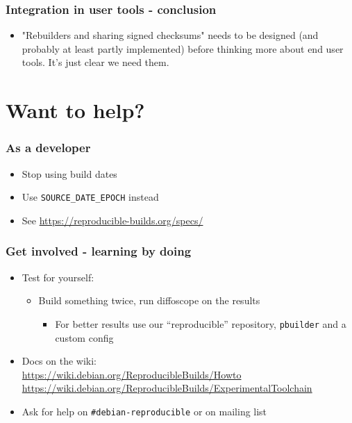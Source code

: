 \documentclass[14pt]{beamer}
\begin{document}
\begin{frame}
 \frametitle{Integration in user tools - conclusion}
 \begin{itemize}
  \item "Rebuilders and sharing signed checksums" needs to be designed
  (and probably at least partly implemented) before thinking more about end
  user tools. It's just clear we need them. 
 \end{itemize}
\end{frame}

\section{Want to help?}

\begin{frame}
 \frametitle{As a developer}
 \begin{itemize}
  \item Stop using build dates
  \item Use \texttt{SOURCE\_DATE\_EPOCH} instead
  \item See \url{https://reproducible-builds.org/specs/}
 \end{itemize}
\end{frame}

\begin{frame}
 \frametitle{Get involved - learning by doing}

 \begin{itemize}
  \item Test for yourself:
   \begin{itemize}
    \item Build something twice, run diffoscope on the results
    \begin{itemize}
     \item For better results use our “reproducible” repository, \texttt{pbuilder} and a custom config
    \end{itemize}
   \end{itemize}
  \item Docs on the wiki: \\
    \small{\url{https://wiki.debian.org/ReproducibleBuilds/Howto}} \\
    \small{\url{https://wiki.debian.org/ReproducibleBuilds/ExperimentalToolchain}}
  \item Ask for help on \texttt{\#debian-reproducible} or on mailing list
 \end{itemize}
\end{frame}
\end{document}
